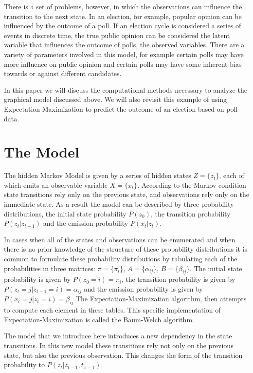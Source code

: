 \documentclass{amsart}
\theoremstyle{definition}
\theoremstyle{remark}
\numberwithin{equation}{section}
\begin{document}
There is a set of problems, however, in which the observations can influence the transition to the next state. In an election, for example, popular opinion can be influenced by the outcome of a poll. If an election cycle is considered a series of events in discrete time, the true public opinion can be considered the latent variable that influences the outcome of polls, the observed variables. There are a variety of parameters involved in this model, for example certain polls may have more influence on public opinion and certain polls may have some inherent bias towards or against different candidates.

In this paper we will discuss the computational methods necessary to analyze the graphical model discussed above. We will also revisit this example of using Expectation Maximization to predict the outcome of an election based on poll data.

\section{The Model}
The hidden Markov Model is given by a series of hidden states $Z = \{ z_t\}$, each of which emits an observable variable $X = \{ x_t\}$. According to the Markov condition state transitions rely only on the previous state, and observations rely only on the immediate state. As a result the model can be described by three probability distributions, the initial state probability $P(z_0)$, the transition probability $P(z_t|z_{t-1})$ and the emission probability $P(x_t|z_t)$.

In cases when all of the states and observations can be enumerated and when there is no prior knowledge of the structure of these probability distributions it is common to formulate these probability distributions by tabulating each of the probabilities in three matrices: $\pi = \{\pi_i\}$, $A = \{ \alpha_{ij}\}$, $B = \{ \beta_{ij}\}$. The initial state probability is given by $P(z_0 = i) = \pi_i$, the transition probability is given by $P(z_t = j | z_{t-1} = i) = \alpha_{ij}$ and the emission probability is given by $P(x_t = j | z_t = i) = \beta_{ij}$ The Expectation-Maximization algorithm, then attempts to compute each element in these tables. This specific implementation of Expectation-Maximization is called the Baum-Welch algorithm.

The model that we introduce here introduces a new dependency in the state transitions. In this new model these transitions rely not only on the previous state, but also the previous observation. This changes the form of the transition probability to $P(z_t | z_{t-1}, t_{x-1})$.
\end{document}
